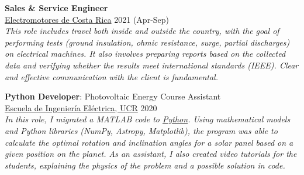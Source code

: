 \begin{tcolorbox}[title=Experience \faBriefcase, colframe=blue!25!black]
        \tcbline
        
        \textbf{Sales \& Service Engineer} \\
        \faMapMarker \hspace{0mm} \href{https://electromotores.com/}{Electromotores de Costa Rica}  \hspace{9.8cm} \faCalendar \hspace{0mm} 2021 (Apr-Sep)\\
        \textit{This role includes travel both inside and outside the country, with the goal of performing tests (ground insulation, ohmic resistance, surge, partial discharges) on electrical machines. It also involves preparing reports based on the collected data and verifying whether the results meet international standards (IEEE). Clear and effective communication with the client is fundamental.}%

        \tcbline

        \textbf{Python Developer}: Photovoltaic Energy Course Assistant\\
            \faMapMarker \hspace{0mm} \href{https://eie.ucr.ac.cr/}{Escuela de Ingeniería Eléctrica, UCR}  \hspace{8.8cm} \faCalendar \hspace{0mm} 2020\\ \textit{In this role, I migrated a MATLAB code to \href{https://github.com/Jimenez96Vega/Photovoltaic_System.git}{Python}. Using mathematical models and Python libraries (NumPy, Astropy, Matplotlib), the program was able to calculate the optimal rotation and inclination angles for a solar panel based on a given position on the planet. As an assistant, I also created video tutorials for the students, explaining the physics of the problem and a possible solution in code.}   

    \end{tcolorbox}
    

